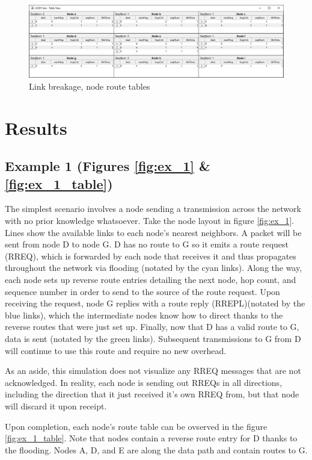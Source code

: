\documentclass[conference]{IEEEtran}
\begin{document}
\begin{figure}
	\centering
	\includegraphics[width=6.8in]{Ex_3_table.png}
	\caption{Link breakage, node route tables}
	\label{fig:ex_3_table}
\end{figure}

\section{Results}

\subsection{Example 1 \footnotesize(Figures \ref{fig:ex_1} \& \ref{fig:ex_1_table})}

The simplest scenario involves a node sending a transmission across the network with no prior knowledge whatsoever. Take the node layout in figure \ref{fig:ex_1}. Lines show the available links to each node's nearest neighbors. A packet will be sent from node D to node G. D has no route to G so it emits a route request (RREQ), which is forwarded by each node that receives it and thus propagates throughout the network via flooding (notated by the cyan links). Along the way, each node sets up reverse route entries detailing the next node, hop count, and sequence number in order to send to the source of the route request. Upon receiving the request, node G replies with a route reply (RREPL)(notated by the blue links), which the intermediate nodes know how to direct thanks to the reverse routes that were just set up. Finally, now that D has a valid route to G, data is sent (notated by the green links). Subsequent transmissions to G from D will continue to use this route and require no new overhead.

As an aside, this simulation does not visualize any RREQ messages that are not acknowledged. In reality, each node is sending out RREQs in all directions, including the direction that it just received it's own RREQ from, but that node will discard it upon receipt.

Upon completion, each node's route table can be ovserved in the figure \ref{fig:ex_1_table}. Note that nodes contain a reverse route entry for D thanks to the flooding. Nodes  A, D, and E are along the data path and contain routes to G.
\end{document}
